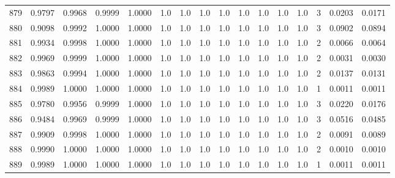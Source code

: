 \begin{tabular}{lrrrrrrrrrrrrrrr}
879 &      0.9797 &  0.9968 &  0.9999 &  1.0000 &     1.0 &     1.0 &     1.0 &     1.0 &     1.0 &     1.0 &      1.0 &        1.0 &      3 &                    0.0203 &                     0.0171 \\
880 &      0.9098 &  0.9992 &  1.0000 &  1.0000 &     1.0 &     1.0 &     1.0 &     1.0 &     1.0 &     1.0 &      1.0 &        1.0 &      3 &                    0.0902 &                     0.0894 \\
881 &      0.9934 &  0.9998 &  1.0000 &  1.0000 &     1.0 &     1.0 &     1.0 &     1.0 &     1.0 &     1.0 &      1.0 &        1.0 &      2 &                    0.0066 &                     0.0064 \\
882 &      0.9969 &  0.9999 &  1.0000 &  1.0000 &     1.0 &     1.0 &     1.0 &     1.0 &     1.0 &     1.0 &      1.0 &        1.0 &      2 &                    0.0031 &                     0.0030 \\
883 &      0.9863 &  0.9994 &  1.0000 &  1.0000 &     1.0 &     1.0 &     1.0 &     1.0 &     1.0 &     1.0 &      1.0 &        1.0 &      2 &                    0.0137 &                     0.0131 \\
884 &      0.9989 &  1.0000 &  1.0000 &  1.0000 &     1.0 &     1.0 &     1.0 &     1.0 &     1.0 &     1.0 &      1.0 &        1.0 &      1 &                    0.0011 &                     0.0011 \\
885 &      0.9780 &  0.9956 &  0.9999 &  1.0000 &     1.0 &     1.0 &     1.0 &     1.0 &     1.0 &     1.0 &      1.0 &        1.0 &      3 &                    0.0220 &                     0.0176 \\
886 &      0.9484 &  0.9969 &  0.9999 &  1.0000 &     1.0 &     1.0 &     1.0 &     1.0 &     1.0 &     1.0 &      1.0 &        1.0 &      3 &                    0.0516 &                     0.0485 \\
887 &      0.9909 &  0.9998 &  1.0000 &  1.0000 &     1.0 &     1.0 &     1.0 &     1.0 &     1.0 &     1.0 &      1.0 &        1.0 &      2 &                    0.0091 &                     0.0089 \\
888 &      0.9990 &  1.0000 &  1.0000 &  1.0000 &     1.0 &     1.0 &     1.0 &     1.0 &     1.0 &     1.0 &      1.0 &        1.0 &      2 &                    0.0010 &                     0.0010 \\
889 &      0.9989 &  1.0000 &  1.0000 &  1.0000 &     1.0 &     1.0 &     1.0 &     1.0 &     1.0 &     1.0 &      1.0 &        1.0 &      1 &                    0.0011 &                     0.0011 \\

\end{tabular}

